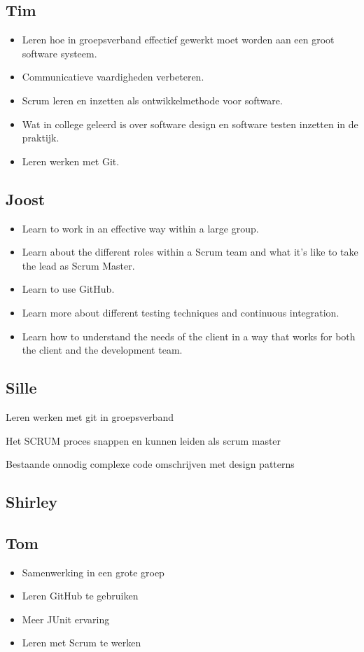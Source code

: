 \documentclass{article}
\begin{document}
\subsection*{Tim}
\begin{itemize}
	\item Leren hoe in groepsverband effectief gewerkt moet worden aan een groot software systeem.
	\item Communicatieve vaardigheden verbeteren.
	\item Scrum leren en inzetten als ontwikkelmethode voor software.
	\item Wat in college geleerd is over software design en software testen inzetten in de praktijk.
	\item Leren werken met Git.
\end{itemize}
\subsection*{Joost}
\begin{itemize}
	\item Learn to work in an effective way within a large group.
	\item Learn about the different roles within a Scrum team and what it's like to take the lead as Scrum Master.
	\item Learn to use GitHub.
	\item Learn more about different testing techniques and continuous integration.
	\item Learn how to understand the needs of the client in a way that works for both the client and the development team.
\end{itemize}
\subsection*{Sille}
	\item Leren werken met git in groepsverband
	\item Het SCRUM proces snappen en kunnen leiden als scrum master
	\item Bestaande onnodig complexe code omschrijven met design patterns
\subsection*{Shirley}
\subsection*{Tom}
\begin{itemize}
	\item Samenwerking in een grote groep
	\item Leren GitHub te gebruiken
	\item Meer JUnit ervaring
	\item Leren met Scrum te werken
\end{itemize}
\end{document}
